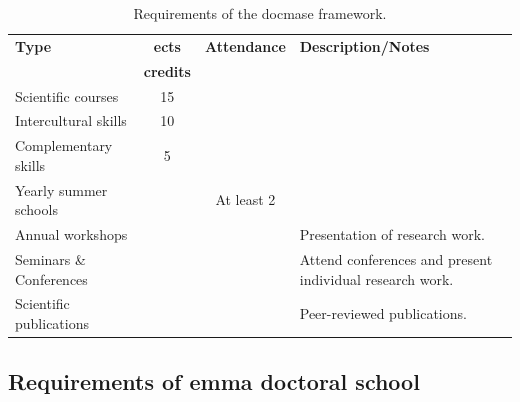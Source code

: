\documentclass[a4paper, twoside,12pt, abstract]{scrartcl} %
\begin{document}
\begin{table}[h!]
  \centering
  \small
  \caption[Requirements of the \acrfull{docmase} framework.]{Requirements of the \acrfull{docmase} framework.\\[5pt]}
    \begin{tabularx}{\textwidth}{p{}ccp{}}
    \toprule
  \textbf{Type} & \textbf{\acrshort{ects}}&\textbf{Attendance}&\textbf{Description/Notes} \\
  & \textbf{credits}&&\\
    \midrule
   Scientific courses&15&&\\
   Intercultural skills&10&&\\
   Complementary skills&5&&\\
   Yearly summer schools&&At least 2&\\
   Annual workshops&&&Presentation of research work.\\
   Seminars \& Conferences&&&Attend conferences and present individual research work.\\
   Scientific publications&&&Peer-reviewed publications.\\
    \bottomrule
    \end{tabularx}%
  \label{tab:docmase_tab}%
\end{table}%

\newpage

\subsection{Requirements of \acrshort{emma} doctoral school}
\end{document}
